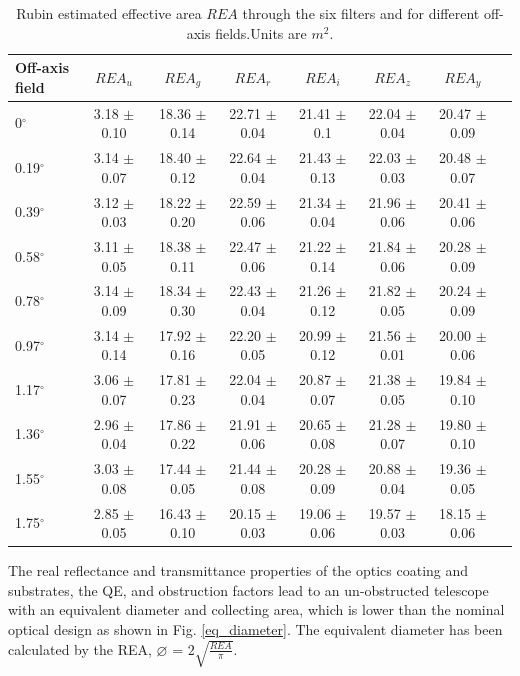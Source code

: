 \documentclass[SE,authoryear,toc]{lsstdoc}
\begin{document}
\begin{table}
\begin{center}
\begin{tabular}{p{1.4cm}*{7}{c}} \hline

Off-axis field & $REA_u$ & $REA_g$ & $REA_r$ & $REA_i$ & $REA_z$ & $REA_y$\\
\hline
0$^\circ$ & 3.18 $\pm$ 0.10 & 18.36 $\pm$ 0.14 & 22.71 $\pm$ 0.04 & 21.41 $\pm$  0.1 & 22.04 $\pm$  0.04 & 20.47 $\pm$ 0.09 \\
0.19$^\circ$ & 3.14 $\pm$  0.07 & 18.40 $\pm$  0.12 & 22.64 $\pm$  0.04 & 21.43 $\pm$ 0.13 & 22.03 $\pm$ 0.03 & 20.48  $\pm$ 0.07 \\
0.39$^\circ$ & 3.12 $\pm$  0.03 & 18.22 $\pm$  0.20 & 22.59 $\pm$  0.06 & 21.34 $\pm$  0.04 & 21.96 $\pm$ 0.06 & 20.41 $\pm$  0.06 \\
0.58$^\circ$ & 3.11 $\pm$ 0.05 & 18.38 $\pm$  0.11 & 22.47 $\pm$  0.06 & 21.22 $\pm$ 0.14 & 21.84 $\pm$ 0.06 & 20.28  $\pm$  0.09 \\
0.78$^\circ$ & 3.14 $\pm$  0.09 & 18.34 $\pm$  0.30 &22.43  $\pm$  0.04 & 21.26 $\pm$  0.12 & 21.82 $\pm$ 0.05 & 20.24 $\pm$  0.09 \\
0.97$^\circ$ & 3.14 $\pm$  0.14 & 17.92 $\pm$  0.16 & 22.20 $\pm$  0.05 & 20.99 $\pm$  0.12 & 21.56 $\pm$ 0.01& 20.00  $\pm$  0.06 \\
1.17$^\circ$ & 3.06 $\pm$  0.07 & 17.81 $\pm$  0.23 & 22.04 $\pm$  0.04 & 20.87 $\pm$  0.07 & 21.38 $\pm$ 0.05 & 19.84  $\pm$  0.10\\
1.36$^\circ$ & 2.96 $\pm$  0.04 & 17.86 $\pm$  0.22 & 21.91 $\pm$  0.06 & 20.65 $\pm$  0.08 & 21.28 $\pm$ 0.07 & 19.80  $\pm$  0.10\\
1.55$^\circ$ & 3.03 $\pm$  0.08 & 17.44 $\pm$  0.05 & 21.44 $\pm$  0.08 & 20.28 $\pm$  0.09 & 20.88 $\pm$ 0.04 & 19.36  $\pm$ 0.05\\
1.75$^\circ$ & 2.85  $\pm$ 0.05 & 16.43 $\pm$  0.10 & 20.15 $\pm$  0.03 & 19.06 $\pm$  0.06 & 19.57 $\pm$  0.03 & 18.15  $\pm$ 0.06\\

\hline
\end{tabular}
\caption{Rubin estimated effective area $REA$ through the six filters and for different off-axis fields.\label{eff_table} Units are $m^2$.}
 \end{center}
 \end{table}


The real reflectance and transmittance properties of the optics coating and substrates, the QE, and obstruction factors lead to an un-obstructed telescope with an equivalent diameter and collecting area, which is lower than the nominal optical design as shown in Fig. \ref{eq_diameter}. The equivalent diameter has been calculated by the REA, $\diameter$ = $2\sqrt{\frac{REA}{\pi}}$.
\end{document}
